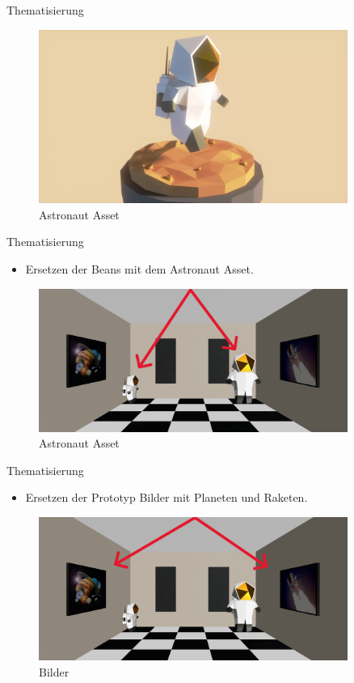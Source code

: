 \documentclass{beamer}
\begin{document}
\begin{frame}{Thematisierung}
\begin{figure}
    \centering
\includegraphics[width=0.9\textwidth, keepaspectratio]{astro}
\caption{Astronaut Asset}
\end{figure}
\end{frame}


\begin{frame}{Thematisierung}
\begin{itemize}
\item Ersetzen der Beans mit dem Astronaut Asset.
\end{itemize}
\begin{figure}
    \centering
\includegraphics[width=0.9\textwidth, keepaspectratio]{thema1}
\caption{Astronaut Asset}
\end{figure}
\end{frame}


\begin{frame}{Thematisierung}
\begin{itemize}
\item Ersetzen der Prototyp Bilder mit Planeten und Raketen.
\end{itemize}
\begin{figure}
    \centering
\includegraphics[width=0.9\textwidth, keepaspectratio]{thema2}
\caption{Bilder}
\end{figure}
\end{frame}
\end{document}
